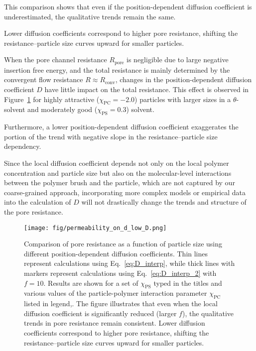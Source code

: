 \documentclass[10pt, a4paper]{article}
\begin{document}
\begin{multicols}{2}
This comparison shows that even if the position-dependent diffusion coefficient is underestimated, the qualitative trends remain the same.

Lower diffusion coefficients correspond to higher pore resistance, shifting the resistance–particle size curves upward for smaller particles.

When the pore channel resistance $R_{\text{pore}}$ is negligible due to large negative insertion free energy, and the total resistance is mainly determined by the convergent flow resistance $R \approx R_{\text{conv}}$, changes in the position-dependent diffusion coefficient $D$ have little impact on the total resistance. This effect is observed in Figure~\ref{fig:permeability_ond_low_D} for highly attractive ($\chi_{\text{PC}} = -2.0$) particles with larger sizes in a $\theta$-solvent and moderately good ($\chi_{\text{PS}} = 0.3$) solvent.

Furthermore, a lower position-dependent diffusion coefficient exaggerates the portion of the trend with negative slope in the resistance–particle size dependency.

Since the local diffusion coefficient depends not only on the local polymer concentration and particle size but also on the molecular-level interactions between the polymer brush and the particle, which are not captured by our coarse-grained approach, incorporating more complex models or empirical data into the calculation of $D$ will not drastically change the trends and structure of the pore resistance.


\end{multicols}

\begin{figure}[H]
    \centering
    \texttt{[image: fig/permeability\_on\_d\_low\_D.png]}
    \caption{
        Comparison of pore resistance as a function of particle size using different position-dependent diffusion coefficients.
        Thin lines represent calculations using Eq.~\ref{eq:D_interp}, while thick lines with markers represent calculations using Eq.~\ref{eq:D_interp_2} with $f = 10$.
        Results are shown for a set of $\chi_{\text{PS}}$ typed in the titles and various values of the particle-polymer interaction parameter $\chi_{\text{PC}}$ listed in legend,.
        The figure illustrates that even when the local diffusion coefficient is significantly reduced (larger $f$), the qualitative trends in pore resistance remain consistent.
        Lower diffusion coefficients correspond to higher pore resistance, shifting the resistance–particle size curves upward for smaller particles.
        }
    \label{fig:permeability_ond_low_D}
\end{figure}
\end{document}
